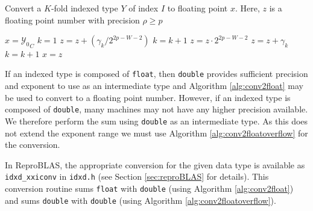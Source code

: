     \begin{samepage}
    \begin{alg}
      Convert a $K$-fold indexed type $Y$ of index $I$ to floating point $x$.
      Here, $z$ is a floating point number with precision $\rho \geq p$
      \begin{algorithmic}[1]
            \State $x = {\mathcal{Y}_0}_C$
            \State \Return
          \EndIf
          \State $k = 1$
            \State $z = z + (\gamma_k / 2^{2 p - W - 2})$
            \State $k = k + 1$
          \EndWhile
          \State $z = z \cdot 2^{2 p - W - 2}$
            \State $z = z + \gamma_k$
            \State $k = k + 1$
          \EndWhile
          \State $x = z$
        \EndFunction
      \end{algorithmic}
      \label{alg:conv2floatoverflow}
    \end{alg}
    \end{samepage}

    If an indexed type is composed of \texttt{float}, then \texttt{double}
    provides sufficient precision and exponent to use as an intermediate type
    and Algorithm \ref{alg:conv2float} may be used to convert to a floating
    point number.  However, if an indexed type is composed of \texttt{double},
    many machines may not have any higher precision available. We therefore
    perform the sum using \texttt{double} as an intermediate type. As this does
    not extend the exponent range we must use Algorithm
    \ref{alg:conv2floatoverflow} for the conversion.

    In ReproBLAS, the appropriate conversion for the given data type is available as \texttt{idxd\_xxiconv} in \texttt{idxd.h} (see Section \ref{sec:reproBLAS} for details). This conversion routine sums \texttt{float} with \texttt{double} (using Algorithm \ref{alg:conv2float}) and sums \texttt{double} with \texttt{double} (using Algorithm \ref{alg:conv2floatoverflow}).
